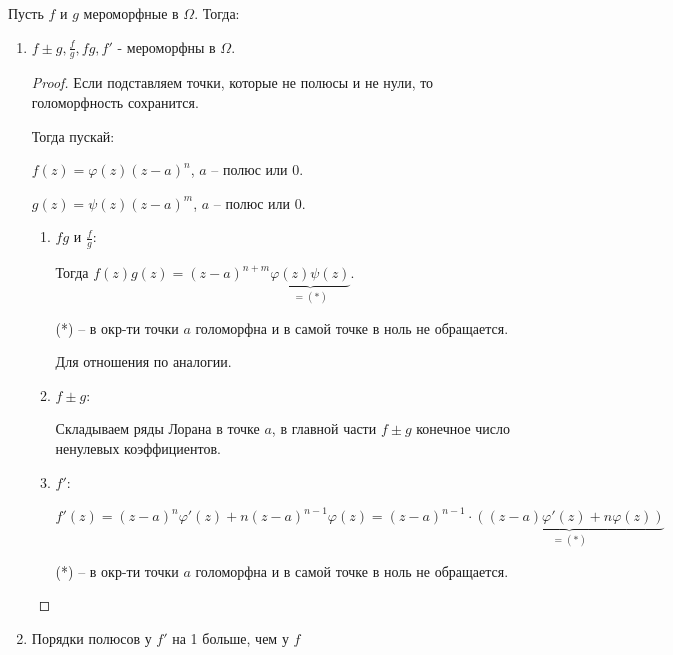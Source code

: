 \begin{properties}
    Пусть $f$ и $g$ мероморфные в $\Omega$. Тогда:

    \begin{enumerate}
        \item {
            $f \pm g, \frac{f}{g}, fg, f'$ - мероморфны в $\Omega$.

            \begin{proof}
                
                Если подставляем точки, которые не полюсы и не нули, то голоморфность сохранится.
                
                Тогда пускай:

                $f(z) = \varphi (z) (z - a)^n$, $a$ -- полюс или $0$.

                $g(z) = \psi (z) (z - a)^m$, $a$ -- полюс или $0$.

                \begin{enumerate}
                    \item {
                        $fg$ и $\frac{f}{g}$:

                        Тогда $f(z)g(z) = (z - a)^{n + m} \underbrace{\varphi(z) \psi(z)}_{= (*)}$.

                        (*) -- в окр-ти точки $a$ голоморфна и в самой точке в ноль не обращается.

                        Для отношения по аналогии.
                    }
                    \item {
                        $f \pm g$:
                        
                        Складываем ряды Лорана в точке $a$, в главной части $f \pm g$ конечное число ненулевых коэффициентов.
                    }
                    \item {
                        $f'$:

                        $f'(z) = (z - a)^n \varphi'(z) + n (z - a)^{n - 1} \varphi(z) = (z - a)^{n - 1} \cdot \underbrace{\left( (z - a) \varphi'(z) + n \varphi(z) \right)}_{= (*)}$

                        (*) -- в окр-ти точки $a$ голоморфна и в самой точке в ноль не обращается.


                    }
                \end{enumerate}
            \end{proof}
        }
        \item {
            Порядки полюсов у $f'$ на 1 больше, чем у $f$
        }
    \end{enumerate}
\end{properties}

